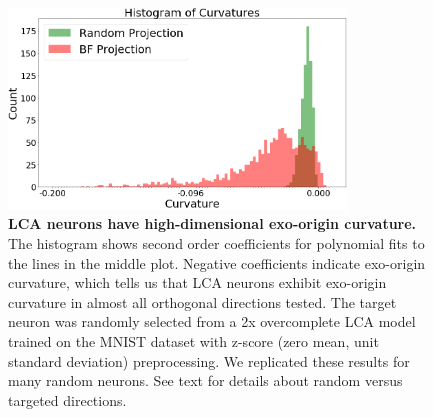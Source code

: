 \begin{figure}[h]
    \centering
    \includegraphics[width=0.8\textwidth]{figures/iso_contour_lca_hists.png}
    \caption{\textbf{LCA neurons have high-dimensional exo-origin curvature.} The histogram shows second order coefficients for polynomial fits to the lines in the middle plot. Negative coefficients indicate exo-origin curvature, which tells us that LCA neurons exhibit exo-origin curvature in almost all orthogonal directions tested. The target neuron was randomly selected from a 2x overcomplete LCA model trained on the MNIST dataset with z-score (zero mean, unit standard deviation) preprocessing. We replicated these results for many random neurons. See text for details about random versus targeted directions.}
    \label{fig:ch4_iso_contour_lca_hists}
\end{figure}




